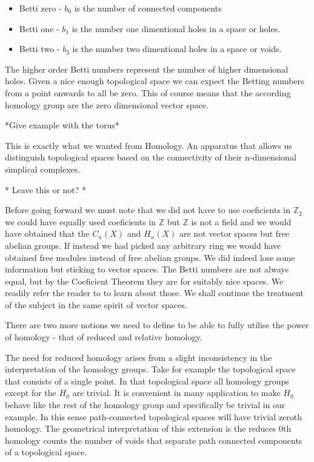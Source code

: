 \begin{itemize}
    \item Betti zero - $b_0$ is the number of connected components
    \item Betti one - $b_1$ is the number one dimentional holes in a space or holes.
    \item Betti two - $b_3$ is the number two dimentional holes in a space or voids.
\end{itemize}


The higher order Betti numbers represent the number of higher dimensional holes. Given a nice enough topological space we can expect the Betting numbers from a point onwards to all be zero. This of course means that the according homology group are the zero dimensional vector space.

*Give example with the torus*

This is exactly what we wanted from Homology. An apparatus that allows us distinguish topological spaces based on the connectivity of their n-dimensional simplical complexes.

* Leave this or not? *

Before going forward we must note that we did not have to use coeficients in $\mathbb{Z}_2$ we could have equally used coeficients in $\mathbb{Z}$ but $\mathbb{Z}$ is not a field and we would have obtained that the $C_n(X)$ and $H_n(X)$ are not vector spaces but free abelian groups. If instead we had picked any arbitrary ring we would have obtained free modules instead of free abelian groups. We did indeed lose some information but sticking to vector spaces. The Betti numbers are not always equal, but by the Coeficient Theorem they are for suitably nice spaces. We readily refer the reader to \cite{algebraic-topology} to learn about those. We shall continue the treatment of the subject in the same spirit of vector spaces.


There are two more notions we need to define to be able to fully utilise the power of homology - that of reduced and relative homology.

The need for reduced homology arises from a slight inconsistency in the interpretation of the homology groups. Take for example the topological space that consists of a single point. In that topological space all homology groups except for the $H_0$ are trivial. It is convenient in many application to make $H_0$ behave like the rest of the homology group and specifically be trivial in our example. In this sense path-connected topological spaces will have trivial zeroth homology. The geometrical interpretation of this extension is the reduces 0th homology counts the number of voids that separate path connected components of a topological space.

